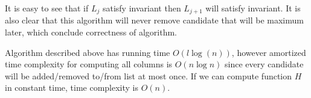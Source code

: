 It is easy to see that if $L_j$ satisfy invariant then $L_{j+1}$ will satisfy
invariant. It is also clear that this algorithm will never remove candidate that
will be maximum later, which conclude correctness of algorithm.

Algorithm described above has running time $O(l\log(n))$, however amortized time
complexity for computing all columns is $O(n\log n)$ since every candidate 
will be added/removed to/from list at most once. If we can compute function $H$
in constant time, time complexity is $O(n)$.







